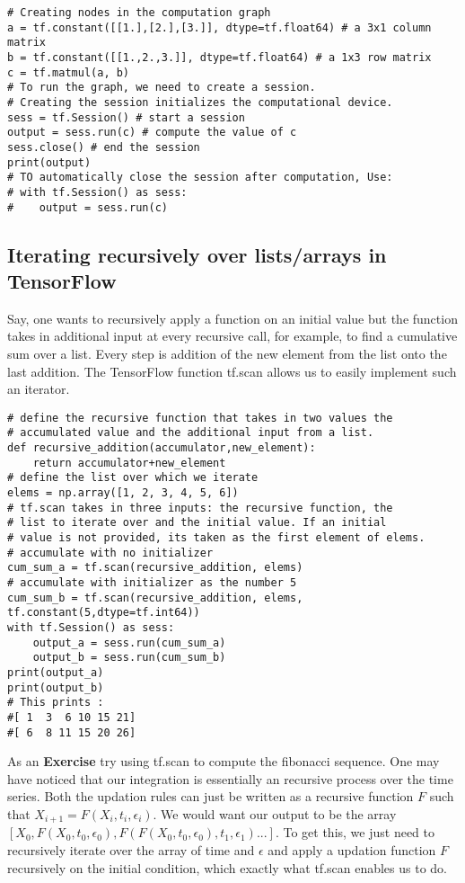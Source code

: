 \documentclass[10pt,letterpaper]{article}
\begin{document}
\begin{verbatim}
# Creating nodes in the computation graph 
a = tf.constant([[1.],[2.],[3.]], dtype=tf.float64) # a 3x1 column matrix 
b = tf.constant([[1.,2.,3.]], dtype=tf.float64) # a 1x3 row matrix 
c = tf.matmul(a, b) 
# To run the graph, we need to create a session.
# Creating the session initializes the computational device.
sess = tf.Session() # start a session
output = sess.run(c) # compute the value of c
sess.close() # end the session
print(output)
# TO automatically close the session after computation, Use:
# with tf.Session() as sess:
#    output = sess.run(c) 
\end{verbatim}

\subsection*{Iterating recursively over lists/arrays in TensorFlow}

Say, one wants to recursively apply a function on an initial value but the function takes in additional input at every recursive call, for example, to find a cumulative sum over a list. Every step is addition of the new element from the list onto the last addition. The TensorFlow function tf.scan allows us to easily implement such an iterator.

\begin{verbatim}
# define the recursive function that takes in two values the
# accumulated value and the additional input from a list.
def recursive_addition(accumulator,new_element):
    return accumulator+new_element
# define the list over which we iterate
elems = np.array([1, 2, 3, 4, 5, 6])
# tf.scan takes in three inputs: the recursive function, the 
# list to iterate over and the initial value. If an initial 
# value is not provided, its taken as the first element of elems.
# accumulate with no initializer
cum_sum_a = tf.scan(recursive_addition, elems) 
# accumulate with initializer as the number 5
cum_sum_b = tf.scan(recursive_addition, elems, tf.constant(5,dtype=tf.int64))
with tf.Session() as sess:
    output_a = sess.run(cum_sum_a)
    output_b = sess.run(cum_sum_b)
print(output_a)
print(output_b)
# This prints :
#[ 1  3  6 10 15 21]
#[ 6  8 11 15 20 26]
\end{verbatim}

As an \textbf{Exercise} try using tf.scan to compute the fibonacci sequence. One may have noticed that our integration is essentially an recursive process over the time series. Both the updation rules can just be written as a recursive function $F$ such that $X_{i+1}=F(X_i,t_i,\epsilon_i)$. We would want our output to be the array $[X_0,F(X_0,t_0,\epsilon_0),F(F(X_0,t_0,\epsilon_0),t_1,\epsilon_1)...]$. To get this, we just need to recursively iterate over the array of time and $\epsilon$ and apply a updation function $F$ recursively on the initial condition, which exactly what tf.scan enables us to do.
\end{document}

